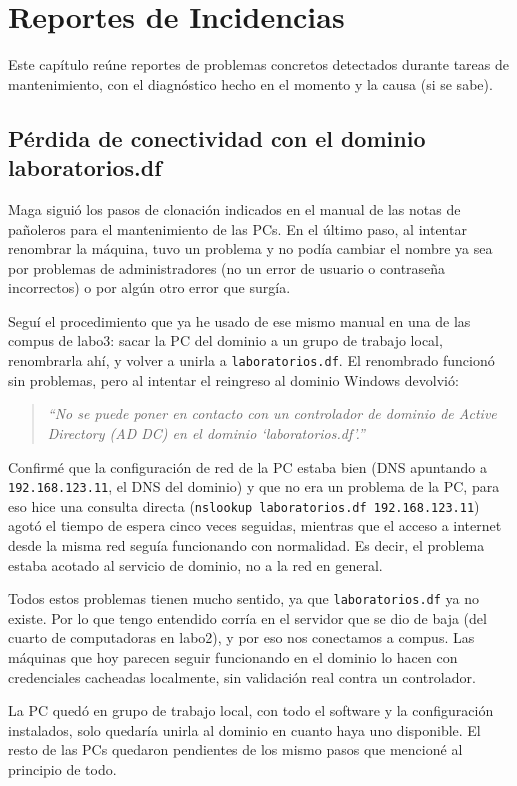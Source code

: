 \chapter[Reportes de Incidencias]{Reportes de Incidencias}
\label{cp:reportes-incidencias}

Este capítulo reúne reportes de problemas concretos detectados durante tareas de mantenimiento, con el diagnóstico hecho en el momento y la causa (si se sabe).

\section{Pérdida de conectividad con el dominio laboratorios.df}

Maga siguió los pasos de clonación indicados en el manual de las notas de pañoleros para el mantenimiento de las PCs. En el último paso, al intentar renombrar la máquina, tuvo un problema y no podía cambiar el nombre ya sea por problemas de administradores (no un error de usuario o contraseña incorrectos) o por algún otro error que surgía.

Seguí el procedimiento que ya he usado de ese mismo manual en una de las compus de labo3: sacar la PC del dominio a un grupo de trabajo local, renombrarla ahí, y volver a unirla a \texttt{laboratorios.df}. El renombrado funcionó sin problemas, pero al intentar el reingreso al dominio Windows devolvió:

\begin{quote}
\textit{``No se puede poner en contacto con un controlador de dominio de Active Directory (AD DC) en el dominio `laboratorios.df'.''}
\end{quote}

Confirmé que la configuración de red de la PC estaba bien (DNS apuntando a \texttt{192.168.123.11}, el DNS del dominio) y que no era un problema de la PC, para eso hice una consulta directa (\texttt{nslookup laboratorios.df 192.168.123.11}) agotó el tiempo de espera cinco veces seguidas, mientras que el acceso a internet desde la misma red seguía funcionando con normalidad. Es decir, el problema estaba acotado al servicio de dominio, no a la red en general.

Todos estos problemas tienen mucho sentido, ya que \texttt{laboratorios.df} ya no existe. Por lo que tengo entendido corría en el servidor que se dio de baja (del cuarto de computadoras en labo2), y por eso nos conectamos a compus. Las máquinas que hoy parecen seguir funcionando en el dominio lo hacen con credenciales cacheadas localmente, sin validación real contra un controlador.

La PC quedó en grupo de trabajo local, con todo el software y la configuración instalados, solo quedaría unirla al dominio en cuanto haya uno disponible. El resto de las PCs quedaron pendientes de los mismo pasos que mencioné al principio de todo.
